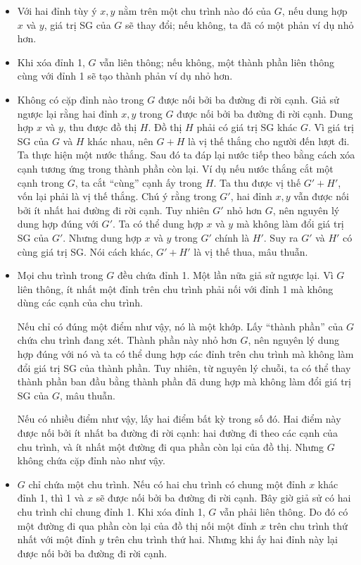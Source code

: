 \documentclass[11pt]{article}
\begin{document}
\begin{itemize}
  \item Với hai đỉnh tùy ý \(x,y\) nằm trên một chu trình nào đó của \(G\), nếu
  dung hợp \(x\) và \(y\), giá trị SG của \(G\) sẽ thay đổi; nếu không, ta đã có
  một phản ví dụ nhỏ hơn.

  \item Khi xóa đỉnh 1, \(G\) vẫn liên thông; nếu không, một thành phần liên
  thông cùng với đỉnh 1 sẽ tạo thành phản ví dụ nhỏ hơn.

  \item Không có cặp đỉnh nào trong \(G\) được nối bởi ba đường đi rời cạnh.
  Giả sử ngược lại rằng hai đỉnh \(x,y\) trong \(G\) được nối bởi ba đường đi
  rời cạnh. Dung hợp \(x\) và \(y\), thu được đồ thị \(H\). Đồ thị \(H\) phải
  có giá trị SG khác \(G\). Vì giá trị SG của \(G\) và \(H\) khác nhau, nên
  \(G+H\) là vị thế thắng cho người đến lượt đi. Ta thực hiện một nước thắng.
  Sau đó ta đáp lại nước tiếp theo bằng cách xóa cạnh tương ứng trong thành
  phần còn lại. Ví dụ nếu nước thắng cắt một cạnh trong \(G\), ta cắt ``cùng''
  cạnh ấy trong \(H\). Ta thu được vị thế \(G'+H'\), vốn lại phải là vị thế
  thắng. Chú ý rằng trong \(G'\), hai đỉnh \(x,y\) vẫn được nối bởi ít nhất hai
  đường đi rời cạnh. Tuy nhiên \(G'\) nhỏ hơn \(G\), nên nguyên lý dung hợp
  đúng với \(G'\). Ta có thể dung hợp \(x\) và \(y\) mà không làm đổi giá trị SG
  của \(G'\). Nhưng dung hợp \(x\) và \(y\) trong \(G'\) chính là \(H'\). Suy ra
  \(G'\) và \(H'\) có cùng giá trị SG. Nói cách khác, \(G'+H'\) là vị thế thua,
  mâu thuẫn.

  \item Mọi chu trình trong \(G\) đều chứa đỉnh 1. Một lần nữa giả sử ngược lại.
  Vì \(G\) liên thông, ít nhất một đỉnh trên chu trình phải nối với đỉnh 1 mà
  không dùng các cạnh của chu trình.

  Nếu chỉ có đúng một điểm như vậy, nó là một khớp. Lấy ``thành phần'' của
  \(G\) chứa chu trình đang xét. Thành phần này nhỏ hơn \(G\), nên nguyên lý
  dung hợp đúng với nó và ta có thể dung hợp các đỉnh trên chu trình mà không
  làm đổi giá trị SG của thành phần. Tuy nhiên, từ nguyên lý chuỗi, ta có thể
  thay thành phần ban đầu bằng thành phần đã dung hợp mà không làm đổi giá trị
  SG của \(G\), mâu thuẫn.

  Nếu có nhiều điểm như vậy, lấy hai điểm bất kỳ trong số đó. Hai điểm này được
  nối bởi ít nhất ba đường đi rời cạnh: hai đường đi theo các cạnh của chu
  trình, và ít nhất một đường đi qua phần còn lại của đồ thị. Nhưng \(G\) không
  chứa cặp đỉnh nào như vậy.

  \item \(G\) chỉ chứa một chu trình. Nếu có hai chu trình có chung một đỉnh
  \(x\) khác đỉnh 1, thì 1 và \(x\) sẽ được nối bởi ba đường đi rời cạnh. Bây
  giờ giả sử có hai chu trình chỉ chung đỉnh 1. Khi xóa đỉnh 1, \(G\) vẫn phải
  liên thông. Do đó có một đường đi qua phần còn lại của đồ thị nối một đỉnh
  \(x\) trên chu trình thứ nhất với một đỉnh \(y\) trên chu trình thứ hai.
  Nhưng khi ấy hai đỉnh này lại được nối bởi ba đường đi rời cạnh.
\end{itemize}
\end{document}
